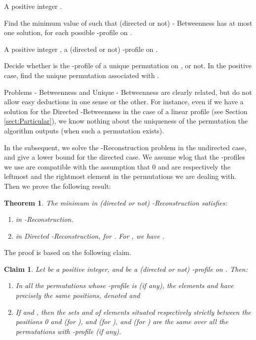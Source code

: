 \documentclass{article}
\newtheorem{thm}{Theorem}
\newtheorem{fait}{Claim}
\begin{document}

 A positive integer .

 Find the minimum value of  such that (directed or not) - {\sc Betweenness} 
has at most one solution, for each possible -profile  on .
\bigskip


 A positive integer , a (directed or not) -profile  on . 

 Decide whether  is the -profile of a unique permutation on ,
or not. In the positive case, find the unique permutation associated with .
\bigskip

Problems - {\sc Betweenness} and  {\sc Unique - Betweenness} are clearly related,
but do not allow easy  deductions in one sense or the other. For instance, even if we have
a solution for the {\sc Directed -Betweenness} in the case of a linear profile 
(see Section \ref{sect:Particular}), we know nothing about the uniqueness of the permutation 
the algorithm outputs (when such a permutation exists).





In the subsequent, we solve the -{\sc Reconstruction} problem in the undirected case,
and give a lower bound for the directed case.  We assume wlog that the 
-profiles we use are compatible with the assumption that 0 and  are respectively 
the leftmost and the rightmost element in the permutations we are dealing with. 
Then we prove the following result:

\begin{thm}
The minimum  in (directed or not) -{\sc Reconstruction} satisfies:

\begin{enumerate}
\item[]   in  -{\sc Reconstruction}.
\item[]  in {\sc Directed -Reconstruction}, for . For , we have .
\end{enumerate}
\label{thm:bounds}
\end{thm}

The proof is based on the following claim. 
\begin{fait}
Let  be a positive integer, and  be a (directed or not) -profile on  . Then: 

\begin{enumerate}
\item In all the permutations whose -profile is  (if any),
the elements  and  have precisely the same positions, denoted  and 
\item If  and , then the sets  and  of elements 
situated  respectively strictly between the positions 0 and  (for ),  and  (for ), 
 and  (for ) are the same over all the permutations with -profile  (if any).
\end{enumerate} 
\label{claim:1n}
\end{fait} 
\end{document}
